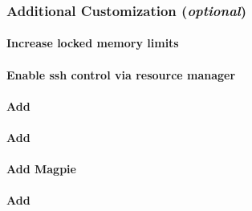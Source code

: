 \documentclass[letterpaper]{article}
\begin{document}


\subsubsection{Additional Customization ({\em optional})} \label{sec:addl_customizations}


\paragraph{Increase locked memory limits}


\paragraph{Enable ssh control via resource manager}


\paragraph{Add \clustershell{}}


\paragraph{Add \genders{}}


\paragraph{Add Magpie}


\paragraph{Add \conman{}} \label{sec:add_conman}

\end{document}
